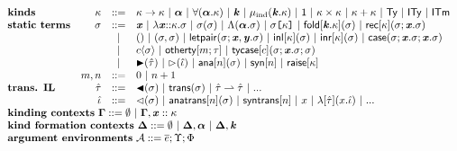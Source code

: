 $\begin{array}{lrcl}%
\textbf{kinds} & \kappa & ::= & %
\karrow{\kappa}{\kappa} ~|~%
\kalpha ~|~%
\kforall{\kalpha}{\kappa} ~|~%
\kvar ~|~%
\kmu{\kvar}{\kappa} ~|~%
\kunit ~|~%
\kprod{\kappa}{\kappa} ~|~%
\ksum{\kappa}{\kappa} ~|~%
\kty ~|~%
\kity ~|~%
\kitm \\
\textbf{static terms} & \st & ::= & %
\sx ~|~%
\slam{\kappa}{\sx}{\st} ~|~%
\sap{\st}{\st} ~|~%
\sLam{\kalpha}{\st} ~|~%
\skap{\kappa}{\st} ~|~%
\sfold{\kvar}{\kappa}{\st} ~|~%
\srec{\kappa}{\st}{\sx}{\st}\\
&&~|~&\striv ~|~%
\spair{\st}{\st} ~|~%
\sletpair{\st}{\sx}{\sy}{\st} ~|~%
\sinl{\kappa}{\st} ~|~%
\sinr{\kappa}{\st} ~|~%
\scase{\st}{\sx}{\st}{\sx}{\st}\\
&&~|~&\sty{c}{\st} ~|~%
{\technical{\sotherty{m}{\tau}}} ~|~%
\stycase{c}{\st}{\sx}{\st}{\st}\\
&&~|~&\sqity{\qity}  ~|~%
\sqitm{\qitm} ~|~%
{\technical{\sana{n}{\st}}} ~|~%
{\technical{\ssyn{n}}} ~|~%
\sraise{\kappa} \\
& {\technical{m}, \technical{n}} & {::=} & {\technical{0} ~|~ \technical{n + 1}}\\
\textbf{trans. IL} & \qity & ::= & \quqty{\st} ~|~ \srep{\st} ~|~ \iparr{\qity}{\qity} ~|~ ...\\
 & \qitm & ::= & \quqtm{\st} ~|~ \anatrans{n}{\st} ~|~ \syntrans{n} ~|~ x ~|~ \ilam{\qity}{x}{\qitm} ~|~ ... \\
\multicolumn{4}{l}{\textbf{kinding contexts}~\kGamma ::= \emptyset ~|~ \kGamma, \sx :: \kappa}\\
\multicolumn{4}{l}{\textbf{kind formation contexts}~\kDelta ::= \emptyset ~|~ \kDelta, \kalpha ~|~ \kDelta, \kvar}\\
\multicolumn{4}{l}{\textbf{argument environments}~\argEnv ::= \es; \Upsilon; \Phi}\\
\end{array}%
$